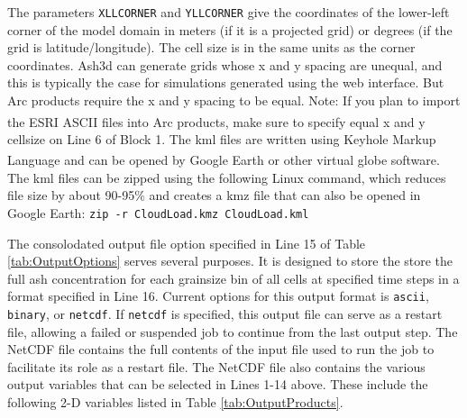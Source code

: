 The parameters \texttt{XLLCORNER} and \texttt{YLLCORNER} give the coordinates
of the lower-left
corner of the model domain in meters (if it is a projected grid) or degrees (if
the grid is latitude/longitude). The cell size is in the same units as the corner
coordinates. 
Ash3d can generate grids whose x and y spacing are unequal, and this is
typically the case for simulations generated using the web interface. But Arc
products require the x and y spacing to be equal. Note: If you plan to import
the ESRI\textsuperscript{\tiny\textregistered} ASCII files into
Arc products, make sure to specify equal x and y cellsize
on Line 6 of Block 1.
The kml files are written using Keyhole Markup Language and can be opened by
Google Earth\textsuperscript{\tiny\textregistered} or other virtual globe
software. The kml files can be zipped using the
following Linux command, which reduces file size by about 90-95\% and creates a
kmz file that can also be opened in Google Earth:
\texttt{zip -r CloudLoad.kmz CloudLoad.kml}

The consolodated output file option specified in Line 15 of Table \ref{tab:OutputOptions}
serves several purposes. It is designed to store the store the full ash concentration
for each grainsize bin
of all cells at specified time steps in a format specified in Line 16. Current options
for this output format is \texttt{ascii}, \texttt{binary}, or \texttt{netcdf}.
If \texttt{netcdf}
is specified, this output file can serve as a restart file, allowing a failed or
suspended job to continue from the last output step. The NetCDF file contains
the full contents of the input file used to run the job to facilitate its
role as a restart file.
The NetCDF file also contains the various output variables that can be selected
in Lines 1-14 above. These include the following 2-D variables listed in
Table \ref{tab:OutputProducts}.


